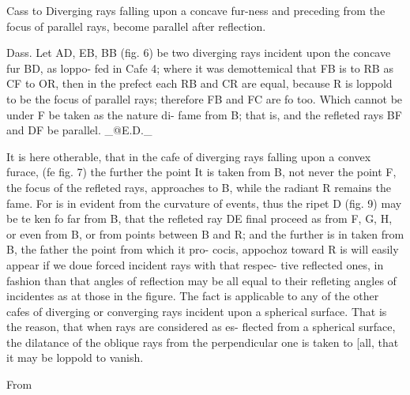 Cass to Diverging rays falling upon a concave fur-ness and preceding from the focus of parallel rays, become parallel after reflection.\par\medskip
Dass. Let AD, EB, BB (fig. 6) be two diverging rays incident upon the concave fur BD, as loppo- fed in Cafe 4; where it was demottemical that FB is to RB as CF to OR, then in the prefect each RB and CR are equal, because R is loppold to be the focus of parallel rays; therefore FB and FC are fo too. Which cannot be under F be taken as the nature di- fame from B; that is, and the refleted rays BF and DF be parallel. \_@E.D.\_\par\medskip
It is here otherable, that in the cafe of diverging rays falling upon a convex furace, (fe fig. 7) the further the point It is taken from B, not never the point F, the focus of the refleted rays, approaches to B, while the radiant R remains the fame. For is in evident from the curvature of events, thus the ripet D (fig. 9) may be te ken fo far from B, that the refleted ray DE final proceed as from F, G, H, or even from B, or from points between B and R; and the further is in taken from B, the father the point from which it pro- cocis, appochoz toward R is will easily appear if we doue forced incident rays with that respec- tive reflected ones, in fashion than that angles of reflection may be all equal to their refleting angles of incidentes as at those in the figure. The fact is applicable to any of the other cafes of diverging or converging rays incident upon a spherical surface. That is the reason, that when rays are considered as es- flected from a spherical surface, the dilatance of the oblique rays from the perpendicular one is taken to [all, that it may be loppold to vanish.\par\medskip
From\par\medskip
